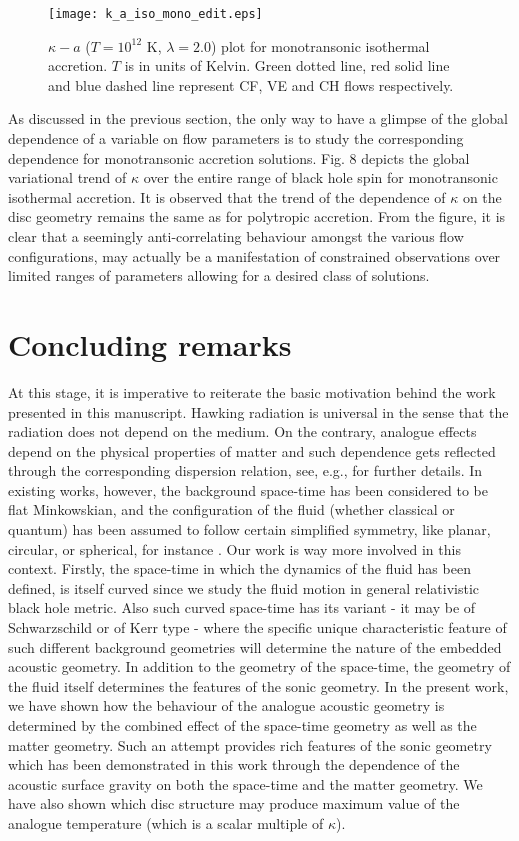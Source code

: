 \documentclass[10pt,authoryear]{article}
\begin{document}
\begin{figure}[h!]
\centering
\texttt{[image: k\_a\_iso\_mono\_edit.eps]}
\caption{$\kappa - a$ ($T=10^{12}$ K, $\lambda=2.0$) plot for monotransonic isothermal accretion. 
$T$ is in units of Kelvin. Green dotted line, red solid line and blue dashed line 
represent CF, VE and CH flows respectively.}
\label{fig8}
\end{figure}

As discussed in the previous section, the only way to have a glimpse of the global dependence of a variable on flow parameters is to study the 
corresponding dependence for monotransonic accretion solutions. Fig. 8 depicts the global variational trend of $\kappa$ over the entire range of black hole 
spin for monotransonic isothermal accretion. It is observed that the trend of the dependence of $\kappa$ on the disc geometry remains the same as for 
polytropic accretion. From the figure, it is clear that a seemingly anti-correlating behaviour amongst the various flow configurations, may actually 
be a manifestation of constrained observations over limited ranges of parameters allowing for a desired class of solutions.

\section{Concluding remarks}

At this stage, it is imperative to reiterate the basic motivation behind the work presented in this manuscript. 
Hawking radiation is universal in the sense that the radiation does not depend on the medium. On the contrary, analogue effects depend on the physical 
properties of matter and such dependence gets reflected through the corresponding dispersion relation, see, e.g., 
\cite{lr12njp,robertson12jpb} for further details. 
In existing works, however, the background space-time has been considered to be flat Minkowskian, and the configuration of the fluid (whether 
classical or quantum) has been assumed to follow certain simplified symmetry, like planar, circular, or spherical, for instance \cite{blv05lrr}. 
Our work is way more 
involved in this context. Firstly, the space-time in which the dynamics of the fluid has been defined, is itself curved since we study the fluid 
motion in general relativistic black hole metric. Also such curved space-time has its variant - it may be of Schwarzschild or of Kerr type - where the 
specific unique characteristic feature of such different background geometries will determine the nature of the embedded acoustic geometry. 
In addition to the geometry of the space-time, the geometry of the fluid itself determines the features of the sonic geometry. In the present 
work, we have shown how the behaviour of the analogue acoustic geometry is determined by the combined effect of the space-time geometry as well as 
the matter geometry. Such an attempt provides rich features of the sonic geometry which has been demonstrated in this work through the 
dependence of the acoustic surface gravity on both the space-time and the matter geometry. We have also shown which disc structure may produce 
maximum value of the analogue temperature (which is a scalar multiple of $\kappa$).
\end{document}
